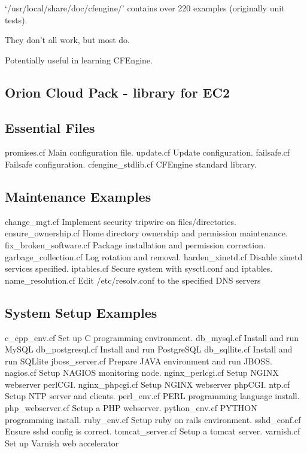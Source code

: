 `/usr/local/share/doc/cfengine/' contains over 220 examples (originally unit tests).

They don't all work, but most do.

Potentially useful in learning CFEngine.





\subsection{Orion Cloud Pack - library for EC2}

\subsection{Essential Files}

\begin{code}
promises.cf            Main configuration file.
update.cf              Update configuration.
failsafe.cf            Failsafe configuration.
cfengine_stdlib.cf     CFEngine standard library.
\end{code}

\subsection{Maintenance Examples}

\begin{code}
change_mgt.cf          Implement security tripwire on files/directories.
ensure_ownership.cf    Home directory ownership and permission maintenance.
fix_broken_software.cf Package installation and permission correction.
garbage_collection.cf  Log rotation and removal.
harden_xinetd.cf       Disable xinetd services specified.
iptables.cf            Secure system with sysctl.conf and iptables.
name_resolution.cf     Edit /etc/resolv.conf to the specified DNS servers
\end{code}

\subsection{System Setup Examples}

\begin{code}
c_cpp_env.cf           Set up C programming environment.
db_mysql.cf            Install and run MySQL
db_postgresql.cf       Install and run PostgreSQL
db_sqllite.cf          Install and run SQLlite
jboss_server.cf        Prepare JAVA environment and run JBOSS.
nagios.cf              Setup NAGIOS monitoring node.
nginx_perlcgi.cf       Setup NGINX webserver perlCGI.
nginx_phpcgi.cf        Setup NGINX webserver phpCGI.
ntp.cf                 Setup NTP server and clients.
perl_env.cf            PERL programming language install.
php_webserver.cf       Setup a PHP webserver.
python_env.cf          PYTHON programming install.
ruby_env.cf            Setup ruby on rails environment.
sshd_conf.cf           Ensure sshd config is correct.
tomcat_server.cf       Setup a tomcat server.
varnish.cf             Set up Varnish web accelerator
\end{code}





